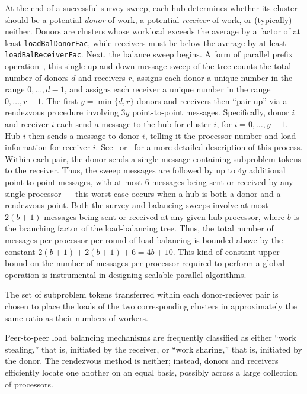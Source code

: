 At the end of a successful survey sweep, each hub determines whether
its cluster should be a potential \emph{donor} of work, a potential
\emph{receiver} of work, or (typically) neither.  Donors are clusters
whose workload exceeds the average by a factor of at least
\texttt{loadBalDonorFac}, while receivers must be below the average by
at least \texttt{loadBalReceiverFac}.  Next, the balance sweep begins.
A form of parallel prefix operation~\cite{Ble89}, this single
up-and-down message sweep of the tree counts the total number of
donors $d$ and receivers $r$, assigns each donor a unique number in
the range $0,\ldots,d-1$, and assigns each receiver a unique number in
the range $0,\ldots,r-1$.  The first $y=\min\{d,r\}$ donors and
receivers then ``pair up'' via a rendezvous procedure involving $3y$
point-to-point messages.  Specifically, donor $i$ and receiver $i$
each send a message to the hub for cluster $i$, for $i=
0,\ldots,y-1$.  Hub $i$ then sends a message to donor $i$, telling it the
processor number and load information for receiver $i$.
See~\cite[Section 6.3]{Hil85} or~\cite{Eck94b,Eck97} for a more
detailed description of this process.  Within each pair, the donor
sends a single message containing subproblem tokens to the receiver.
Thus, the sweep messages are followed by up to $4y$ additional
point-to-point messages, with at most $6$ messages being sent or
received by any single processor --- this worst case occurs when a hub
is both a donor and a rendezvous point.  Both the survey and balancing
sweeps involve at most $2(b+1)$ messages being sent or received at any
given hub processor, where $b$ is the branching factor of the
load-balancing tree.  Thus, the total number of messages per processor
per round of load balancing is bounded above by the constant $2(b+1) +
2(b+1) + 6 = 4b + 10$.  This kind of constant upper bound on the number
of messages per processor required to perform a global operation is
instrumental in designing scalable parallel algorithms.

The set of subproblem tokens transferred within each donor-reciever
pair is chosen to place the loads of the two corresponding clusters in
approximately the same ratio as their numbers of workers.
\fi

Peer-to-peer load balancing mechanisms are frequently classified as
either ``work stealing,'' that is, initiated by the receiver, or
``work sharing,'' that is, initiated by the donor.  The rendezvous
method is neither; instead, donors and receivers efficiently locate
one another on an equal basis, possibly across a large collection of
processors.

